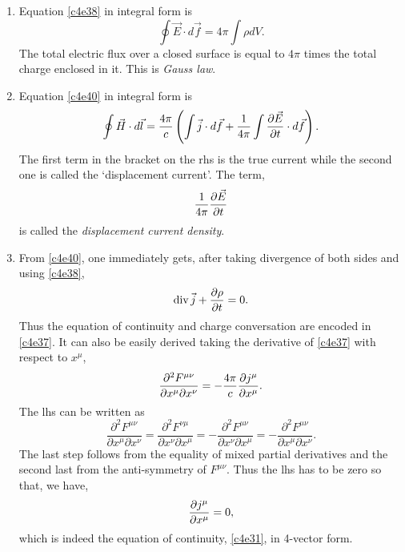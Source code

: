\begin{enumerate}
\item Equation \eqref{c4e38} in integral form is
\begin{equation}\label{c4e41}
\oint\vec{E}\cdot d\vec{f} = 4\pi\int\rho dV.
\end{equation}
The total electric flux over a closed surface is equal to $4\pi$ times the total 
charge enclosed in it. This is \emph{Gauss law}.

\item Equation \eqref{c4e40} in integral form is
\begin{equation}\label{c4e42}
\oint\vec{H}\cdot d\vec{l} = \frac{4\pi}{c}\left(\int\vec{j}\cdot d\vec{f} + 
\frac{1}{4\pi}\int\frac{\partial{\vec{E}}}{\partial{t}}\cdot d\vec{f}\right).
\end{equation}
The first term in the bracket on the rhs is the true current while the second one
is called the `displacement current'. The term,
\[
\frac{1}{4\pi}\frac{\partial{\vec{E}}}{\partial{t}}
\]
is called the \emph{displacement current density}.

\item From \eqref{c4e40}, one immediately gets, after taking divergence of both sides
and using \eqref{c4e38},
\[
\operatorname{div}\vec{j} + \frac{\partial{\rho}}{\partial{t}} = 0.
\]
Thus the equation of continuity and charge conversation are encoded in 
\eqref{c4e37}. It can also be easily derived taking the derivative of \eqref{c4e37}
with respect to $x^\mu$,
\[
\frac{\partial^2 F^{\mu\nu}}{\partial x^\mu \partial x^\nu} = -\frac{4\pi}{c}\frac{\partial{j^\mu}}{\partial{x^\mu}}.
\]
The lhs can be written as
\[
\frac{\partial^2 F^{\mu\nu}}{\partial x^\mu \partial x^\nu} = 
\frac{\partial^2 F^{\nu\mu}}{\partial x^\nu \partial x^\mu}
= -\frac{\partial^2 F^{\mu\nu}}{\partial x^\nu \partial x^\mu} = 
-\frac{\partial^2 F^{\mu\nu}}{\partial x^\mu \partial x^\nu}.
\]
The last step follows from the equality of mixed partial derivatives and the 
second last from the anti-symmetry of $F^{\mu\nu}$. Thus the lhs has to be zero
so that, we have,
\[
\frac{\partial{j^\mu}}{\partial{x^\mu}} = 0,
\]
which is indeed the equation of continuity, \eqref{c4e31}, in 4-vector form.


\end{enumerate}
